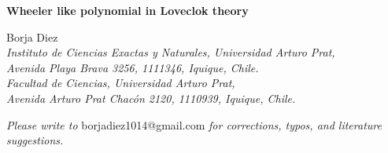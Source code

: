\documentclass[11pt,letterpaper]{article}
\def\author{Borja Diez}
\def\title{Wheeler like polynomial in Loveclok theory}
\begin{document}
{\centering
 \vspace*{1cm}
\textbf{\LARGE{\title{}}}
\vspace{0.5cm}
\begin{center}
\author{}\\
\vspace{0.5cm}
\textit{Instituto de Ciencias Exactas y Naturales, Universidad Arturo Prat,\\
Avenida Playa Brava 3256, 1111346, Iquique, Chile.\\
Facultad de Ciencias, Universidad Arturo Prat,\\
Avenida Arturo Prat Chac\'on 2120, 1110939, Iquique, Chile.}
\end{center}
\vspace{1cm}
\begin{abstract}
\vspace{0.5cm}
\end{abstract}}

\vspace{5cm}

\begin{center}
\textit{Please write to} borjadiez1014@gmail.com \textit{for corrections, typos, and literature suggestions.}
\end{center}


\thispagestyle{empty}

\newpage
\tableofcontents
\thispagestyle{empty}
\newpage
\clearpage
{} 



%











\newpage


\end{document}
